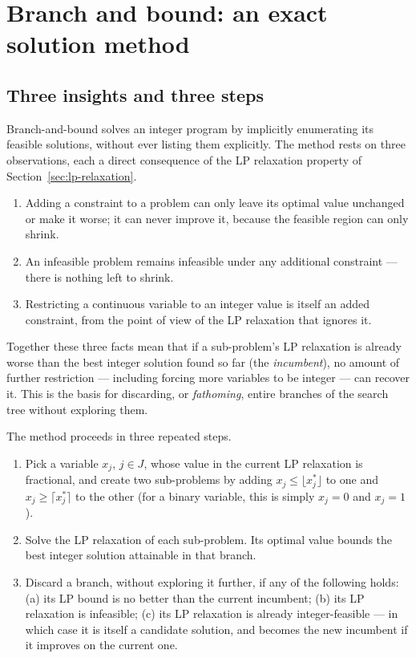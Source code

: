 \section{Branch and bound: an exact solution method}
\label{sec:bnb}

\subsection{Three insights and three steps}

Branch-and-bound solves an integer program by implicitly enumerating its
feasible solutions, without ever listing them explicitly. The method
rests on three observations, each a direct consequence of the LP
relaxation property of Section~\ref{sec:lp-relaxation}.

\begin{enumerate}
  \item Adding a constraint to a problem can only leave its optimal value
  unchanged or make it worse; it can never improve it, because the
  feasible region can only shrink.
  \item An infeasible problem remains infeasible under any additional
  constraint --- there is nothing left to shrink.
  \item Restricting a continuous variable to an integer value is itself
  an added constraint, from the point of view of the LP relaxation that
  ignores it.
\end{enumerate}

Together these three facts mean that if a sub-problem's LP relaxation is
already worse than the best integer solution found so far (the
\emph{incumbent}), no amount of further restriction --- including forcing
more variables to be integer --- can recover it. This is the basis for
discarding, or \emph{fathoming}, entire branches of the search tree
without exploring them.

The method proceeds in three repeated steps.

\begin{enumerate}
  \item[\textbf{Branch.}] Pick a variable $x_j$, $j\in J$, whose value in
  the current LP relaxation is fractional, and create two sub-problems by
  adding $x_j\leq\lfloor x_j^\ast\rfloor$ to one and
  $x_j\geq\lceil x_j^\ast\rceil$ to the other (for a binary variable, this
  is simply $x_j=0$ and $x_j=1$).
  \item[\textbf{Bound.}] Solve the LP relaxation of each sub-problem. Its
  optimal value bounds the best integer solution attainable in that
  branch.
  \item[\textbf{Fathom.}] Discard a branch, without exploring it further,
  if any of the following holds: (a) its LP bound is no better than the
  current incumbent; (b) its LP relaxation is infeasible; (c) its LP
  relaxation is already integer-feasible --- in which case it is itself a
  candidate solution, and becomes the new incumbent if it improves on the
  current one.
\end{enumerate}

